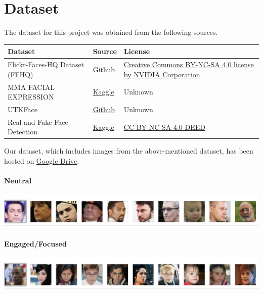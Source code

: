   \chapter{Dataset}
  The dataset for this project was obtained from the following sources.

  \begin{tabular}{ |p{3cm}||p{3cm} ||p{3cm} | }
    \hline
    \textbf{Dataset} & \textbf{Source} & \textbf{License}\\
    \hline
    Flickr-Faces-HQ Dataset (FFHQ) & \href{https://github.com/NVlabs/ffhq-dataset#flickr-faces-hq-dataset-ffhq}{Github} & \href{https://creativecommons.org/licenses/by-nc-sa/4.0/}{Creative Commons BY-NC-SA 4.0 license by NVIDIA Corporation}\\
    \hline
    MMA FACIAL EXPRESSION & \href{https://www.kaggle.com/datasets/mahmoudima/mma-facial-expression/data}{Kaggle} & Unknown\\
    \hline
    UTKFace & \href{https://susanqq.github.io/UTKFace/}{Github} & Unknown\\
    \hline
    Real and Fake Face Detection & \href{https://www.kaggle.com/datasets/ciplab/real-and-fake-face-detection}{Kaggle} & \href{https://creativecommons.org/licenses/by-nc-sa/4.0/}{CC BY-NC-SA 4.0 DEED}\\
    \hline
\end{tabular}
\vspace*{1em}

  \noindent Our dataset, which includes images from the above-mentioned dataset, has been hosted on \href{https://drive.google.com/drive/u/1/folders/15KX23UhhYKx6UGpm-GAEtIsPpweVRHJd}{Google Drive}.\\

  \subsubsection*{Neutral}
    \includegraphics[width=\linewidth]{resources/neutral-carousel.png}
  \subsubsection*{Engaged/Focused}
  \includegraphics[width=\linewidth]{resources/engaged-carousel.png}
